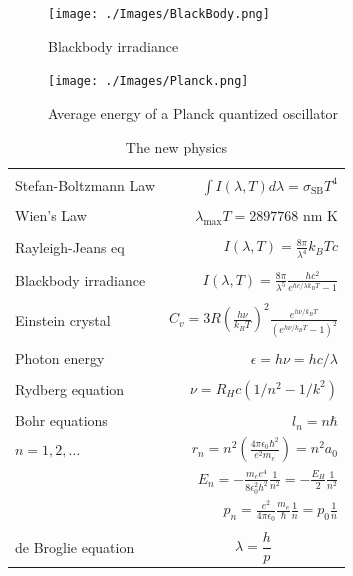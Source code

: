 \documentclass[11pt]{article}
\begin{document}
\begin{figure}[htbp]
\centering
\texttt{[image: ./Images/BlackBody.png]}
\caption{Blackbody irradiance}
\end{figure}
\begin{figure}[htbp]
\centering
\texttt{[image: ./Images/Planck.png]}
\caption{Average energy of a Planck quantized oscillator}
\end{figure}

\begin{table} 
\begin{center}
    \caption{The new physics}
    \begin{tabular}{|lr|}
     \hline
 & \\
Stefan-Boltzmann Law & $\displaystyle  \int I(\lambda,T)d\lambda = \sigma_\mathrm{SB} T^4$
\\ & \\
Wien's Law & $\displaystyle \lambda_\mathrm{max}T=2897768$ nm K \\
 & \\
Rayleigh-Jeans eq& $\displaystyle I(\lambda,T) = \frac{8\pi}{\lambda^4} k_B T c $ \\ 
& \\
Blackbody irradiance & $\displaystyle I(\lambda, T) =
\frac{8\pi}{\lambda^5}\frac{hc^2}{e^{hc/\lambda k_B T}-1}$ \\ 
& \\
Einstein crystal & $\displaystyle C_v=3R \left(\frac{h\nu}{k_BT}\right )^2\frac{e^{h\nu/k_BT}}{\left
            ( e^{h\nu/k_BT}-1 \right )^2}$ \\
& \\
Photon energy & $\displaystyle \epsilon=h\nu = hc/\lambda $ \\
& \\
Rydberg equation & $\displaystyle \nu = R_H c\left (1/n^2
        -1/k^2 \right)$ \\
& \\
Bohr equations & $\displaystyle l_n=n \hbar$ \\
$\displaystyle n=1,2, \ldots $ & $\displaystyle r_n = n^2 \left ( \frac{4 \pi
    \epsilon_0 \hbar^2}{e^2 m_e} \right ) = n^2 a_0$ \\
 & $\displaystyle E_n =-\frac{m_e e^4}{8\epsilon_0^2
   h^2}\frac{1}{n^2}=-\frac{E_H}{2}\frac{1}{n^2}$ \\ 
 & $\displaystyle p_n =\frac{e^2}{4\pi\epsilon_0}\frac{m_e}{\hbar}\frac{1}{n} =
p_0 \frac{1}{n} $ \\
& \\
de Broglie equation & \[\lambda=\dfrac{h}{p}\] \\
\hline
\end{tabular}
\end{center}
\end{table}
\end{document}
